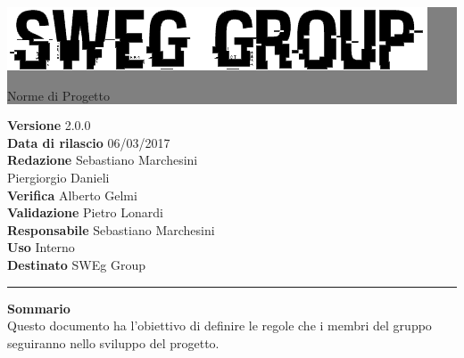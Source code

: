 \documentclass[12pt,a4paper,titlepage]{article}
\newcommand{\HRule}[1]{\hfill \rule{0.2\linewidth}{#1}} %
\begin{document}
	
	\thispagestyle{empty} %
	
	
	\colorbox{grey}{
		\parbox[t]{1.0\linewidth}{
			\centering \fontsize{50pt}{80pt}\selectfont %
			\vspace*{0.7cm} %
			
			\raggedleft
			\includegraphics[width=0.7\linewidth]{../LogoSWEgGroupSFONDOVUOTO.png}
			
			\hfill Norme di Progetto \\
			
			\vspace*{0.7cm} %
		}
	}
	
	
	\vfill %
	
	
	{\centering \large 
		\hfill \textbf{Versione} 2.0.0 \\
		\hfill \textbf{Data di rilascio} 06/03/2017 \\
		\hfill \textbf{Redazione} Sebastiano Marchesini \\
		\hfill Piergiorgio Danieli \\
		\hfill \textbf{Verifica} Alberto Gelmi \\
		\hfill \textbf{Validazione} Pietro Lonardi \\
		\hfill \textbf{Responsabile} Sebastiano Marchesini \\
		\hfill \textbf{Uso} Interno \\
		\hfill \textbf{Destinato} SWEg Group \\ 
		
		\HRule{1pt}
		
		\textbf{Sommario} \\
		Questo documento ha l'obiettivo di definire le regole che i membri del gruppo seguiranno nello sviluppo del progetto.
		
	} %
	
\end{document}
